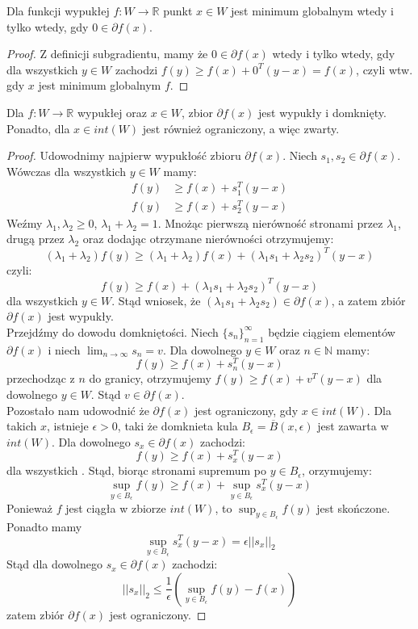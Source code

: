 \documentclass[10pt,a4paper,draft]{report}
\begin{document}
\begin{theorem}
Dla funkcji wypukłej $f : W \rightarrow \mathbb{R}$ punkt $x \in W$ jest minimum globalnym wtedy i tylko wtedy, gdy $0 \in \partial f(x)$.
\end{theorem}
\begin{proof}
Z definicji subgradientu, mamy że $0 \in \partial f(x)$ wtedy i tylko wtedy, gdy dla wszystkich $y \in W$ zachodzi $f(y) \geq f(x) + 0^T(y-x) = f(x)$, czyli wtw. gdy $x$ jest minimum globalnym $f$.
\end{proof}

\begin{lemma}
Dla $f: W \rightarrow \mathbb{R}$ wypukłej oraz $x \in W$, zbior $\partial f(x)$ jest wypukły i domknięty. Ponadto, dla $x \in int(W)$ jest również ograniczony, a więc zwarty.
\end{lemma}
\begin{proof}
Udowodnimy najpierw wypukłość zbioru $\partial f(x)$. Niech $s_1, s_2 \in \partial f(x)$. Wówczas dla wszystkich $y \in W$ mamy:
\[
\begin{aligned}
f(y) & \geq f(x) + s_1^T (y - x) \\
f(y) & \geq f(x) + s_2^T (y - x)
\end{aligned}
\]
Weźmy $\lambda_1, \lambda_2 \geq 0$, $\lambda_1 + \lambda_2 = 1$. Mnożąc pierwszą nierówność stronami przez $\lambda_1$, drugą przez $\lambda_2$ oraz dodając otrzymane nierówności otrzymujemy:
\[
(\lambda_1 + \lambda_2)f(y) \geq (\lambda_1 + \lambda_2) f(x) + (\lambda_1 s_1 + \lambda_2 s_2)^T (y - x)
\]
czyli:
\[
f(y) \geq f(x) + (\lambda_1 s_1 + \lambda_2 s_2)^T (y-x)
\]
dla wszystkich $y \in W$. Stąd wniosek, że $(\lambda_1 s_1 + \lambda_2 s_2) \in \partial f(x)$, a zatem zbiór $\partial f(x)$ jest wypukły.
\\
Przejdźmy do dowodu domkniętości. Niech $\{s_n\}_{n=1}^{\infty}$ będzie ciągiem elementów $\partial f(x)$ i niech $\lim_{n \rightarrow \infty} s_n = v$. Dla dowolnego $y \in W$ oraz $n \in \mathbb{N}$ mamy:
\[
f(y) \geq f(x) + s_n^T(y - x)
\]
przechodząc z $n$ do granicy, otrzymujemy $f(y) \geq f(x) + v^T(y - x)$ dla dowolnego $y \in W$. Stąd $v \in \partial f(x)$.
\\
Pozostało nam udowodnić że $\partial f(x)$ jest ograniczony, gdy $x \in int(W)$. Dla takich $x$, istnieje $\epsilon > 0$, taki że domknieta kula $B_{\epsilon} = \overline{B}(x, \epsilon)$ jest zawarta w $int(W)$. Dla dowolnego $s_x \in \partial f(x)$ zachodzi:
\[
f(y) \geq f(x) + s_x^T(y -x)
\]
dla wszystkich $ $. Stąd, biorąc stronami supremum po $y \in B_{\epsilon}$, orzymujemy:
\[
\sup_{y \in B_{\epsilon}} f(y) \geq f(x) + \sup_{y \in B_{\epsilon}} s_x^T (y - x)
\]
Ponieważ $f$ jest ciągła w zbiorze $int(W)$, to $\sup_{y \in B_{\epsilon}} f(y)$ jest skończone. Ponadto mamy 
\[
\sup_{y \in B_{\epsilon}} s_x^T (y - x) = \epsilon ||s_x||_2
\]
Stąd dla dowolnego $s_x \in \partial f(x)$ zachodzi:
\[
||s_x||_2 \leq \frac{1}{\epsilon} \left(\sup_{y \in B_{\epsilon}} f(y) - f(x) \right)
\]
zatem zbiór $\partial f(x)$ jest ograniczony.


\end{proof}
\end{document}
